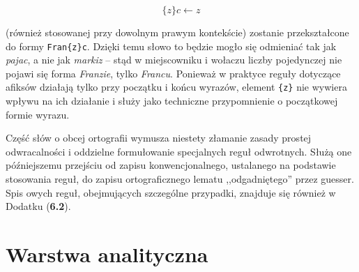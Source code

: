 \documentclass{article}
\begin{document}
\begin{equation}
\{z\}c \leftarrow z
\end{equation}

(również stosowanej przy dowolnym prawym kontekście) zostanie przekształcone do formy \texttt{Fran\{z\}c}.
Dzięki temu słowo to będzie mogło się odmieniać tak jak \textit{pajac}, a nie jak \textit{markiz} --
stąd w miejscowniku i wołaczu liczby pojedynczej nie pojawi się forma \textit{Franzie}, tylko \textit{Francu}.
Ponieważ w praktyce reguły dotyczące afiksów działają tylko przy początku i końcu wyrazów, element \texttt{\{z\}} nie wywiera wpływu na ich działanie i służy jako techniczne przypomnienie o początkowej formie wyrazu.

Część słów o obcej ortografii wymusza niestety złamanie zasady prostej odwracalności i oddzielne formułowanie specjalnych reguł odwrotnych.
Służą one późniejszemu przejściu od zapisu konwencjonalnego, ustalanego na podstawie stosowania reguł, do zapisu ortograficznego lematu ,,odgadniętego'' przez guesser. Spis owych reguł, obejmujących szczególne przypadki, znajduje się również w Dodatku (\textbf{6.2}).

\section{Warstwa analityczna}
\end{document}
